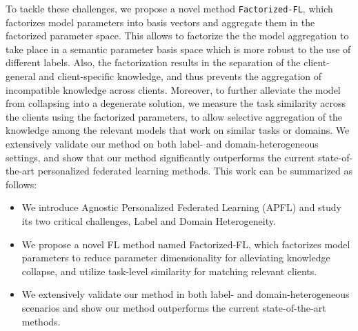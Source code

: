 To tackle these challenges, we propose a novel method \texttt{Factorized-FL}, which factorizes model parameters into basis vectors and aggregate them in the factorized parameter space. This allows to factorize the the model aggregation to take place in a semantic parameter basis space which is more robust to the use of different labels. Also, the factorization results in the separation of the client-general and client-specific knowledge, and thus prevents the aggregation of incompatible knowledge across clients. Moreover, to further alleviate the model from collapsing into a degenerate solution, we measure the task similarity across the clients using the factorized parameters, to allow selective aggregation of the knowledge among the relevant models that work on similar tasks or domains. We extensively validate our method on both label- and domain-heterogeneous settings, and show that our method significantly outperforms the current state-of-the-art personalized federated learning methods. This work can be summarized as follows:

\vspace{-0.05in}
\begin{itemize}[leftmargin=0.2in]
    \vspace{-0.1in}    
	\item We introduce Agnostic Personalized Federated Learning (APFL) and study its two critical challenges, Label and Domain Heterogeneity.
	\vspace{-0.075in}
	\item We propose a novel FL method named Factorized-FL, which factorizes model parameters to reduce parameter dimensionality for alleviating knowledge collapse, and utilize task-level similarity for matching relevant clients.
	\vspace{-0.2in}
	\item We extensively validate our method in both label- and domain-heterogeneous scenarios and show our method outperforms the current state-of-the-art methods.
\end{itemize}

